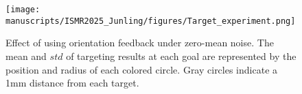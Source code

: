 
     

  



\begin{figure}[h]
  \centering
  \texttt{[image: manuscripts/ISMR2025\_Junling/figures/Target\_experiment.png]}
  \caption{Effect of using orientation feedback under zero-mean noise. The mean and $std$ of targeting results at each goal are represented by the position and radius of each colored circle. Gray circles indicate a 1mm distance from each target.}
  \label{fig:chap-5-white-noise-ori-use}
\end{figure}

